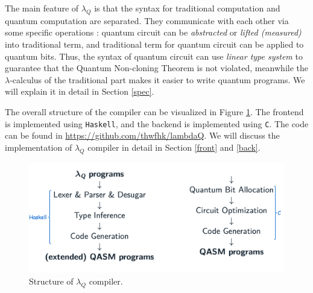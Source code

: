 The main feature of $\lambda_Q$ is that the syntax for traditional computation and quantum computation are separated.
They communicate with each other via some specific operations : quantum circuit can be \textit{abstracted} or \textit{lifted (measured)} into traditional term, and traditional term for quantum circuit can be applied to quantum bits.
Thus, the syntax of quantum circuit can use \textit{linear type system} to guarantee that the Quantum Non-cloning Theorem is not violated, meanwhile the $\lambda$-calculus of the traditional part makes it easier to write quantum programs.
We will explain it in detail in Section \ref{spec}.

The overall structure of the compiler can be visualized in Figure \ref{compiler}.
The frontend is implemented using \texttt{Haskell}, and the backend is implemented using \texttt{C}.
The code can be found in \url{https://github.com/thwfhk/lambdaQ}.
We will discuss the implementation of $\lambda_Q$ compiler in detail in Section \ref{front} and \ref{back}.


\begin{center}
  \begin{figure}
    \label{compiler}
    \centering
    \includegraphics[width=0.9\linewidth]{images/overview.png}
    \caption{Structure of $\lambda_Q$ compiler.}
  \end{figure}
\end{center}